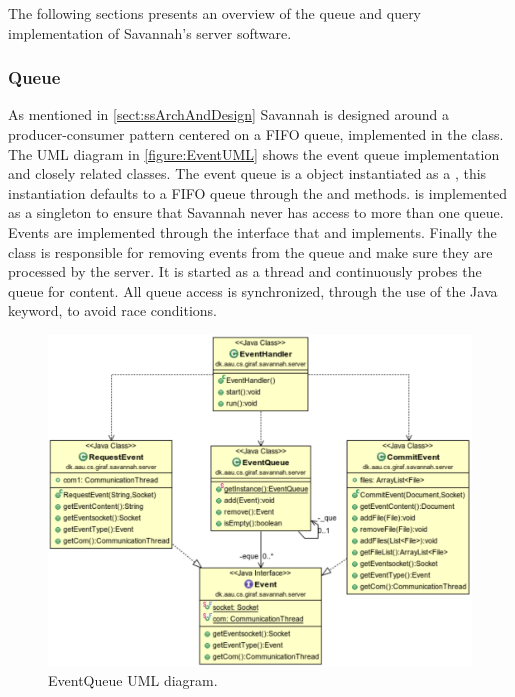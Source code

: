 The following sections presents an overview of the queue and query implementation of Savannah's server software.
\subsubsection{Queue}

As mentioned in \autoref{sect:ssArchAndDesign} Savannah is designed around a producer-consumer pattern centered on a FIFO queue, implemented in the  class.
The UML diagram in \autoref{figure:EventUML} shows the event queue implementation and closely related classes.
The event queue is a  object instantiated as a , this instantiation defaults to a FIFO queue through
the  and  methods.  is implemented as a singleton to ensure that Savannah never has access to more than one queue.
Events are implemented through the  interface that  and  implements.
Finally the  class is responsible for removing events from the queue and make sure they are processed by the server. It is started as a thread and
continuously probes the queue for content. All queue access is synchronized, through the use of the Java  keyword, to avoid race conditions.

\begin{figure}[H]
 \centering
  \includegraphics[width=1.00\textwidth]{images/EventQueue}
  \caption{EventQueue UML diagram.}
  \label{figure:EventUML}
\end{figure}

